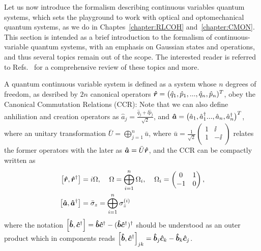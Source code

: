 Let us now introduce the formalism describing continuous variables quantum systems, which sets the playground to work with optical and optomechanical quantum systems, as we do in Chaptes~\ref{chapter:RLCOH} and~\ref{chapter:CMON}. This section is intended as a brief introduction to the formalism of continuous-variable quantum systems, with an emphasis on Gaussian states and operations, and thus several topics remain out of the scope. The interested reader is referred to Refs.~\cite{serafiniBOOK, RevGauss} for a comprehensive review of these topics and more.

A quantum continuous variable system is defined as a system whose $n$ degrees of freedom, as desribed by $2n$ canonical operators $\bm{\hat{r}} = \big(\hat{q}_1, \hat{p}_1, ..., \hat{q}_n, \hat{p}_n)^T$, obey the Canonical Commutation Relations (CCR):
Note that we can also define anhiliation and creation operators as $\hat{a}_j = \frac{\hat{q}_j + \ii \hat{p}_j}{\sqrt{2}}$, and $\bm{\hat{a}} = \big(\hat{a}_1, \hat{a}_1^\dagger...,\hat{a}_n,\hat{a}_n^\dagger\big)^T$, where an unitary transformation $\bar{U} = \bigoplus_{j=1}^{n}\bar{u}$, where $\bar{u} = \frac{1}{\sqrt{2}}\begin{pmatrix}1 & \ii \\ 1 & -\ii \\ \end{pmatrix}$
relates the former operators with the later as $\bm{\hat{a}} = \bar{U}\bm{\hat{r}}$, and the CCR can be compactly written as
\begin{align}\label{eq:cv_ccr}
  \left[\bm{\hat{r}},\bm{\hat{r}}^\dagger\right] &= i \Omega, \;\;\;\; \Omega = \bigoplus_{i=1}^n \Omega_i, \;\;\;\; \Omega_i = \begin{pmatrix} 0&1\\-1&0\\\end{pmatrix}, \\
  \left[\bm{\hat{a}},\bm{\hat{a}}^\dagger\right]&= \bar{\sigma}_z = \bigoplus_{i=1}^n \sigma^{(i)}_z
  \end{align}
where the notation $\left[\bm{\hat{b}},\bm{\hat{c}}^\dagger\right]  = \bm{\hat{b}} \bm{\hat{c}}^\dagger  - (\bm{\hat{b}} \bm{\hat{c}}^\dagger)^\dagger $ should be understood as an outer product which in components reads $\left[\bm{\hat{b}},\bm{\hat{c}}^\dagger\right]_{jk} = \bm{\hat{b}}_j \bm{\hat{c}}_k - \bm{\hat{b}}_k \bm{\hat{c}}_j $.

